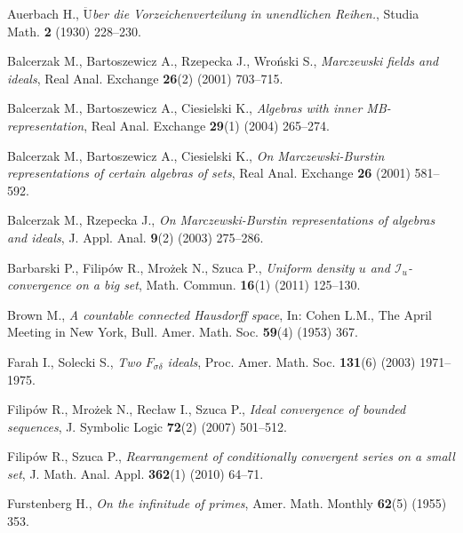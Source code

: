 \documentclass{amsart}
\theoremstyle{definition}
\theoremstyle{definition}
\newcommand{\I}{\mathcal I}
\begin{document}
\begin{thebibliography}{abc}

Auerbach H., \emph{$\ddot{\textrm{U}}$ber die Vorzeichenverteilung in unendlichen Reihen.},
Studia Math. {\bf 2} (1930) 228--230.

Balcerzak M., Bartoszewicz A., Rzepecka J., Wro\'nski S., \emph{Marczewski fields and ideals},
Real Anal. Exchange {\bf 26}(2) (2001) 703--715.

Balcerzak M., Bartoszewicz A., Ciesielski K., \emph{Algebras with inner MB-representation},
Real Anal. Exchange {\bf 29}(1) (2004) 265--274.

Balcerzak M., Bartoszewicz A., Ciesielski K., \emph{On Marczewski-Burstin representations of certain algebras of sets},
Real Anal. Exchange {\bf 26} (2001) 581--592.

Balcerzak M., Rzepecka J., \emph{On Marczewski-Burstin representations of algebras and ideals},
J. Appl. Anal. {\bf 9}(2) (2003) 275--286.

Barbarski P., Filip\'ow R., Mro\.zek N., Szuca P., \emph{Uniform density $u$ and $\I_u$-convergence on a big set},
Math. Commun. {\bf 16}(1) (2011) 125--130.


Brown M., \emph{A countable connected Hausdorff space},
In: Cohen L.M., The April Meeting in New York, Bull. Amer. Math. Soc. {\bf 59}(4) (1953) 367.


Farah I., Solecki S., \emph{Two $F_{\sigma\delta}$ ideals},
Proc. Amer. Math. Soc. {\bf 131}(6) (2003) 1971--1975.

Filip\'ow R., Mro\.zek N., Rec\l{}aw I., Szuca P., \emph{Ideal convergence of bounded sequences},
J. Symbolic Logic {\bf 72}(2) (2007) 501--512.

Filip\'ow R., Szuca P., \emph{Rearrangement of conditionally convergent series on a small set},
J. Math. Anal. Appl. {\bf 362}(1) (2010) 64--71.

Furstenberg H., \emph{On the infinitude of primes},
Amer. Math. Monthly {\bf 62}(5) (1955) 353.


\end{thebibliography}
\end{document}
